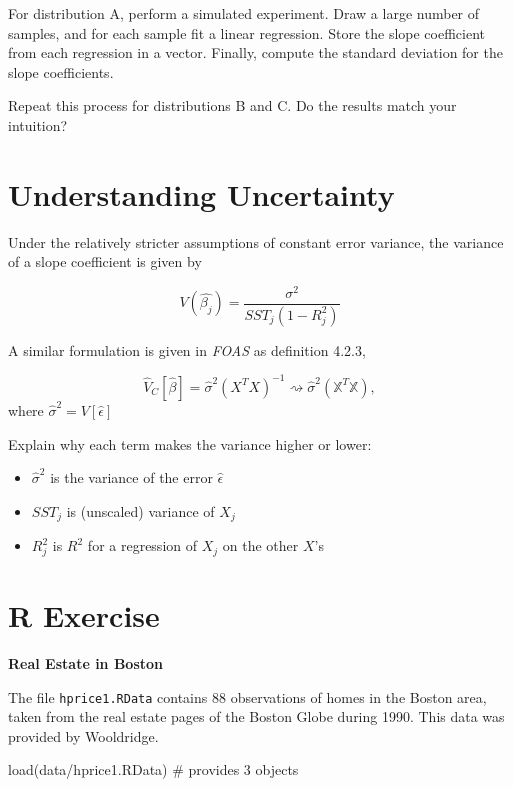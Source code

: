 \documentclass[
  letterpaper,
  DIV=11,
  numbers=noendperiod]{scrreprt}
\newenvironment{Shaded}{\begin{snugshade}}{\end{snugshade}}
\newcommand{\CommentTok}[1]{\textcolor[rgb]{0.37,0.37,0.37}{#1}}
\newcommand{\FunctionTok}[1]{\textcolor[rgb]{0.28,0.35,0.67}{#1}}
\newcommand{\NormalTok}[1]{\textcolor[rgb]{0.00,0.23,0.31}{#1}}
\newcommand{\StringTok}[1]{\textcolor[rgb]{0.13,0.47,0.30}{#1}}
\providecommand{\tightlist}{%
  \setlength{\itemsep}{0pt}\setlength{\parskip}{0pt}}\usepackage{longtable,booktabs,array}
\begin{document}
For distribution A, perform a simulated experiment. Draw a large number
of samples, and for each sample fit a linear regression. Store the slope
coefficient from each regression in a vector. Finally, compute the
standard deviation for the slope coefficients.

Repeat this process for distributions B and C. Do the results match your
intuition?

\section{Understanding Uncertainty}\label{understanding-uncertainty-1}

Under the relatively stricter assumptions of constant error variance,
the variance of a slope coefficient is given by

\[
  V(\hat{\beta_j}) = \frac{\sigma^2}{SST_j (1-R_j^2)}
\]

A similar formulation is given in \emph{FOAS} as definition 4.2.3,

\[
  \hat{V}_{C}[\hat{\beta}] = \hat{\sigma}^2 \left( X^{T} X \right)^{-1} \rightsquigarrow \hat{\sigma}^{2}{\left(\mathbb{X}^{T}\mathbb{X}\right)}, 
\] where \(\hat{\sigma}^{2} = V[\hat{\epsilon}]\)

Explain why each term makes the variance higher or lower:

\begin{itemize}
\tightlist
\item
  \(\hat{\sigma}^2\) is the variance of the error \(\hat{\epsilon}\)
\item
  \(SST_j\) is (unscaled) variance of \(X_j\)
\item
  \(R_j^2\) is \(R^2\) for a regression of \(X_j\) on the other \(X\)'s
\end{itemize}

\section{R Exercise}\label{r-exercise-1}

\textbf{Real Estate in Boston}

The file \texttt{hprice1.RData} contains 88 observations of homes in the
Boston area, taken from the real estate pages of the Boston Globe during
1990. This data was provided by Wooldridge.

\begin{Shaded}
\begin{Highlighting}[]
\FunctionTok{load}\NormalTok{(}\StringTok{\textquotesingle{}data/hprice1.RData\textquotesingle{}}\NormalTok{) }\CommentTok{\# provides 3 objects }
\end{Highlighting}
\end{Shaded}
\end{document}
